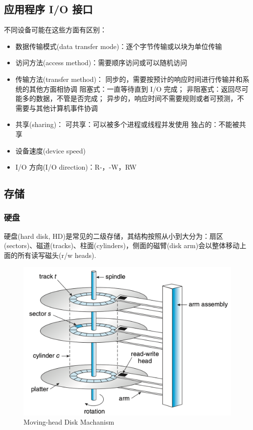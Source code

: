 \subsection{应用程序 I/O 接口}
不同设备可能在这些方面有区别：
\begin{itemize}
    \item 数据传输模式(data transfer mode)：逐个字节传输或以块为单位传输
    \item 访问方法(access method)：需要顺序访问或可以随机访问
    \item 传输方法(transfer method)：
    \subitem 同步的，需要按预计的响应时间进行传输并和系统的其他方面相协调
    \subsubitem 阻塞式：一直等待直到 I/O 完成；
    \subsubitem 非阻塞式：返回尽可能多的数据，不管是否完成；
    \subitem 异步的，响应时间不需要规则或者可预测，不需要与其他计算机事件协调
    \item 共享(sharing)：
    \subitem 可共享：可以被多个进程或线程并发使用
    \subitem 独占的：不能被共享
    \item 设备速度(device speed)
    \item I/O 方向(I/O direction)：R-，-W，RW
\end{itemize}

\subsection{存储}
\subsubsection{硬盘}
硬盘(hard disk, HD)是常见的二级存储，其结构按照从小到大分为：扇区(sectors)、磁道(tracks)、柱面(cylinders)，侧面的磁臂(disk arm)会以整体移动上面的所有读写磁头(r/w heads). 

\begin{figure}[H]
    \centering
    \includegraphics[width=0.618\linewidth]{pic/OS-CheatSheet/硬盘}
    \caption{Moving-head Disk Machanism}
\end{figure}

